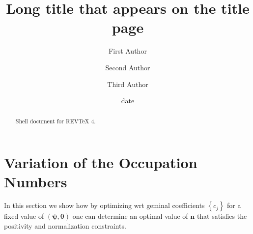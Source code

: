 \documentclass[aps,preprint]{revtex4}%
\begin{document}
\title[Short title for running header]{Long title that appears on the title page}
\author{First Author}
\author{Second Author}
\author{Third Author}

\begin{abstract}
Shell document for REV\TeX{} 4.

\end{abstract}
\date[Date text]{date}




\maketitle
\tableofcontents


\section{Variation of the Occupation Numbers\label{OccVar}}

In this section we show how by optimizing wrt geminal coefficients $\left\{
c_{j}\right\}  $ for a fixed value of $\left(  \mathbf{\mathbf{\psi},\theta
}\right)  $ one can determine an optimal value of $\mathbf{n}$ that satisfies
the positivity and normalization constraints.
\end{document}
